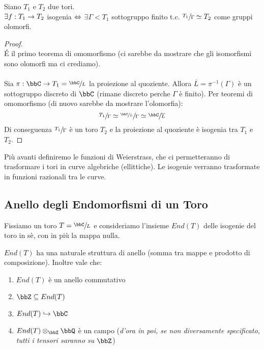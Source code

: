 \begin{proposizione}
Siano $T_{1}$ e $T_{2}$ due tori.\\
$\exists f:T_{1} \rightarrow T_{2}$ isogenia $\Leftrightarrow$ $\exists \Gamma < T_{1}$ sottogruppo finito t.c. $\sfrac{T_{1}}{\Gamma} \simeq T_{2}$ come gruppi olomorfi. 
\end{proposizione}
\begin{proof}
\fbox{$\Rar$}\\
\'E il primo teorema di omomorfismo (ci sarebbe da mostrare che gli isomorfismi sono olomorfi ma ci crediamo).\\
\fbox{$\Leftarrow$}\\
Sia $\pi:\bbC \rar T_{1} = \sfrac{\bbC}{L}$ la proiezione al quoziente. Allora $\overline{L}=\pi^{-1}(\Gamma)$ è un sottogruppo discreto di $\bbC$ (rimane discreto perche $\Gamma$ è finito). Per teoremi di omomorfismo (di nuovo sarebbe da mostrare l'olomorfia):
$$\sfrac{T_{1}}{\Gamma} \simeq \sfrac{\sfrac{\bbC}{L}}{\Gamma} \simeq \sfrac{\bbC}{\overline{L}}$$
Di conseguenza $\sfrac{T_{1}}{\Gamma}$ è un toro $T_{2}$ e la proiezione al quoziente è isogenia tra $T_{1}$ e $T_{2}$.
\end{proof}

Più avanti definiremo le funzioni di Weierstrass, che ci permetteranno di trasformare i tori in curve algebriche (ellittiche). Le isogenie verranno trasformate in funzioni razionali tra le curve.

\subsection{Anello degli Endomorfismi di un Toro}

Fissiamo un toro $T=\sfrac{\bbC}{L}$ e consideriamo l'insieme $End(T)$ delle isogenie del toro in sè, con in più la mappa nulla.

\begin{proposizione} $End(T)$ ha una naturale struttura di anello (somma tra mappe e prodotto di composizione). Inoltre vale che:
\begin{enumerate}
\item $End(T)$ è un anello commutativo
\item $\bbZ \subseteq End(T)$
\item $End(T) \hookrightarrow \bbC$
\item $End(T) \otimes_{\bbZ} \bbQ$ è un campo ({\it d'ora in poi, se non diversamente specificato, tutti i tensori saranno su $\bbZ$})
\end{enumerate}
\end{proposizione}

